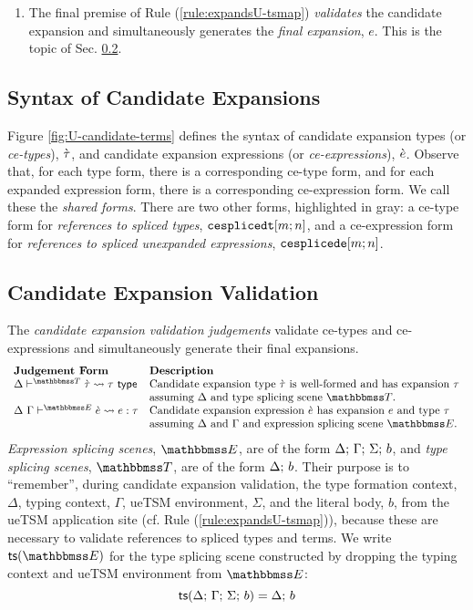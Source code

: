 \begin{enumerate}
\item The final premise of Rule (\ref{rule:expandsU-tsmap}) \emph{validates} the candidate expansion and simultaneously generates the \emph{final expansion}, $e$. This is the topic of Sec. \ref{sec:ce-validation-U}.
\end{enumerate}
\subsection{Syntax of Candidate Expansions}\label{sec:ce-syntax-U}
Figure \ref{fig:U-candidate-terms} defines the syntax of candidate expansion types (or \emph{ce-types}), $\grave{\tau}$, and candidate expansion expressions  (or \emph{ce-expressions}), $\grave{e}$. Observe that, for each type form, there is a corresponding ce-type form, and for each expanded expression form, there is a corresponding ce-expression form. We call these the \emph{shared forms}. There are two other forms, highlighted in gray: a ce-type form for \emph{references to spliced types}, $\texttt{cesplicedt}[m; n]$, and a ce-expression form for \emph{references to spliced unexpanded expressions}, $\texttt{cesplicede}[m; n]$. %

\subsection{Candidate Expansion Validation}\label{sec:ce-validation-U}
The \emph{candidate expansion validation judgements} validate ce-types and ce-expressions and simultaneously generate their final expansions.%
\[\begin{array}{ll}
\textbf{Judgement Form} & \textbf{Description}\\
\cvalidT{\Delta}{\tscenev}{\ctau}{\tau} & \text{Candidate expansion type $\ctau$ is well-formed and has expansion $\tau$}\\
& \text{assuming $\Delta$ and type splicing scene $\tscenev$.}\\
\cvalidE{\Delta}{\Gamma}{\escenev}{\ce}{e}{\tau} & \text{Candidate expansion expression $\ce$ has expansion $e$ and type $\tau$}\\
& \text{assuming $\Delta$ and $\Gamma$ and expression splicing scene $\escenev$.}
\end{array}\]
\emph{Expression splicing scenes}, $\escenev$, are of the form $\Delta;\,\Gamma;\,\Sigma;\,b$, and \emph{type splicing scenes}, $\tscenev$, are of the form $\Delta;\,b$. Their purpose is to ``remember'', during candidate expansion validation, the type formation context, $\Delta$, typing context, $\Gamma$, ueTSM environment, $\Sigma$, and the literal body, $b$, from the ueTSM application site (cf. Rule (\ref{rule:expandsU-tsmap})), because these are necessary to validate references to spliced types and terms. We write $\tsfrom{\escenev}$ for the type splicing scene constructed by dropping the typing context and ueTSM environment from $\escenev$:
\[\mathsf{ts}(\Delta;\,\Gamma;\,\Sigma;\,b) = \Delta;\,b\]

